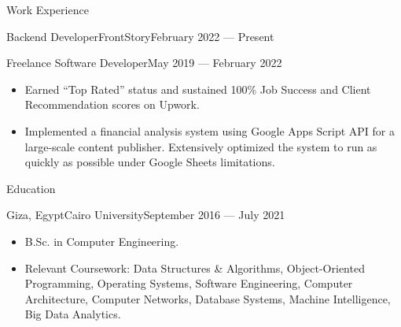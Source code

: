 \documentclass[]{mcdowellcv}
\begin{document}
	\makeheader
	
	
	\begin{cvsection}{Work Experience}
		\begin{cvsubsection}{Backend Developer}{FrontStory}{February 2022 — Present}
		\end{cvsubsection}
		\begin{cvsubsection}{Freelance Software Developer}{}{May 2019 — February 2022}
			\begin{itemize}
				\item Earned “Top Rated” status and sustained 100\% Job Success and Client Recommendation scores on Upwork.
				\item Implemented a financial analysis system using Google Apps Script API for a large-scale content publisher. Extensively optimized the system to run as quickly as possible under Google Sheets limitations.
			\end{itemize}
		\end{cvsubsection}
	\end{cvsection}
	
	\begin{cvsection}{Education}
		\begin{cvsubsection}{Giza, Egypt}{Cairo University}{September 2016 — July 2021}
			\begin{itemize}
				\item B.Sc. in Computer Engineering.
				\item Relevant Coursework: Data Structures \& Algorithms, Object-Oriented Programming, Operating Systems, Software Engineering, Computer Architecture, Computer Networks, Database Systems, Machine Intelligence, Big Data Analytics.
			\end{itemize}
		\end{cvsubsection}
	\end{cvsection}
	
\end{document}
